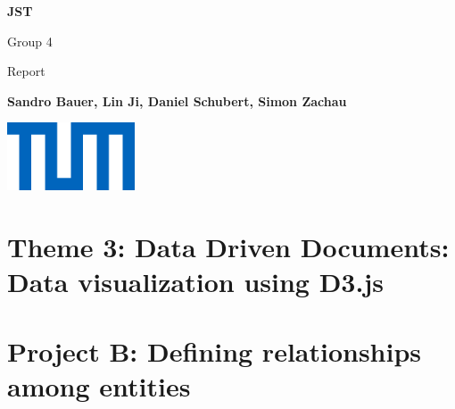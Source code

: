 

\usepackage{lipsum}



\begin{titlepage}
	\begin{center}
		\makeatletter
		\vspace*{1cm}
		
		\Huge
		\textbf{JST}
		
		\vspace{0.5cm}
		\LARGE
		Group 4

		\vspace{0.5cm}
		\LARGE
		Report
		
		\vfill

		\vspace{1.5cm}
		\textbf{Sandro Bauer, Lin Ji, Daniel Schubert, Simon Zachau}
		
		\vfill
		

		\Large
		\includegraphics[height=2cm]{img/tum-logo.png}\\
		\vspace{1.5cm}
		\@date
		\makeatother
	\end{center}
\end{titlepage}
\newpage
\tableofcontents
\newpage

\section{Theme 3: Data Driven Documents: Data visualization using D3.js}
\lipsum[0-5]

\section{Project B: Defining relationships among entities}
\lipsum[0-5]

